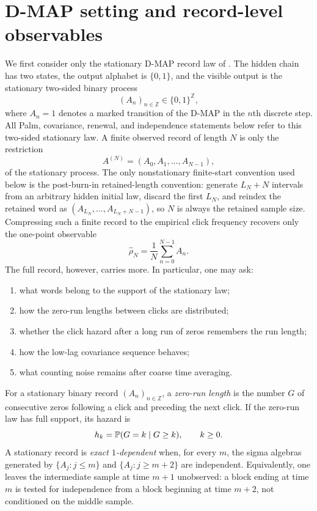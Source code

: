 \section{D-MAP setting and record-level observables}\label{sec:operational}

We first consider only the stationary D-MAP record law of
.  The hidden chain has two states, the
output alphabet is \(\{0,1\}\), and the visible output is the stationary
two-sided binary process
\[
(A_n)_{n\in\mathbb Z}\in\{0,1\}^{\mathbb Z},
\]
where \(A_n=1\) denotes a marked transition of the D-MAP in the \(n\)th
discrete step.  All Palm, covariance, renewal, and independence
statements below refer to this two-sided stationary law.  A finite observed
record of length \(N\) is only the restriction
\[
A^{(N)}=(A_0,A_1,\ldots,A_{N-1}),
\]
of the stationary process.  The only nonstationary finite-start convention
used below is the post-burn-in retained-length convention: generate
\(L_N+N\) intervals from an arbitrary hidden initial law, discard the first
\(L_N\), and reindex the retained word as
\((A_{L_N},\ldots,A_{L_N+N-1})\), so \(N\) is always the retained sample size.
Compressing such a finite record to the empirical click
frequency recovers only the one-point observable
\[
\widehat\rho_N=\frac{1}{N}\sum_{n=0}^{N-1}A_n.
\]
The full record, however, carries more. In particular, one may ask:
\begin{enumerate}[label=\textup{(\alph*)},leftmargin=2.0em,itemsep=0.25em]
\item what words belong to the support of the stationary law;
\item how the zero-run lengths between clicks are distributed;
\item whether the click hazard after a long run of zeros remembers the run length;
\item how the low-lag covariance sequence behaves;
\item what counting noise remains after coarse time averaging.
\end{enumerate}
\begin{definition}\label{def:record-benchmarks-main}
For a stationary binary record $(A_n)_{n\in\mathbb Z}$, a \emph{zero-run length} is the number $G$ of consecutive zeros following a click and preceding the next click. If the zero-run law has full support, its hazard is
\[
h_k=\mathbb{P}(G=k\mid G\ge k),\qquad k\ge0 .
\]
A stationary record is \emph{exact $1$-dependent} when, for every $m$, the sigma algebras generated by $\{A_j:j\le m\}$ and $\{A_j:j\ge m+2\}$ are independent.
Equivalently, one leaves the intermediate sample at time $m+1$ unobserved: a block ending at time $m$ is tested for independence from a block beginning at time $m+2$, not conditioned on the middle sample.
\end{definition}

